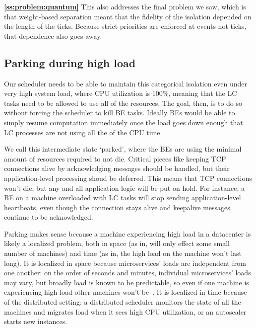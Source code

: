 \textbf{\autoref{ss:problem:quantum}} This also addresses the final problem we
saw, which is that weight-based separation meant that the fidelity of the
isolation depended on the length of the ticks. Because strict priorities are
enforced at events not ticks, that dependence also goes away.

\subsection{Parking during high load}\label{ss:approach:parking}

Our scheduler needs to be able to maintain this categorical isolation even under
very high system load, where CPU utilization is 100\%, meaning that the LC tasks
need to be allowed to use all of the resources. The goal, then, is to do so
without forcing the scheduler to kill BE tasks. Ideally BEs would be able to
simply resume computation immediately once the load goes down enough that LC
processes are not using all the of the CPU time.

We call this intermediate state `parked', where the BEs are using the minimal
amount of resources required to not die. Critical pieces like keeping TCP
connections alive by acknowledging messages should be handled, but their
application-level processing shoud be deferred. This means that TCP connections
won't die, but any and all application logic will be put on hold. For instance, a
BE on a machine overloaded with LC tasks will stop sending application-level
heartbeats, even though the connection stays alive and keepalive messages
continue to be acknowledged.

Parking makes sense because a machine experiencing high load in a datacenter is
likely a localized problem, both in space (as in, will only effect some small
number of machines) and time (as in, the high load on the machine won't last
long). It is localized in space because microservices' loads are independent
from one another: on the order of seconds and minutes, individual microservices'
loads may vary, but broadly load is known to be predictable, so even if one
machine is experiencing high load other machines won't be~\cite{TODO}. It is
localized in time because of the distributed setting: a distributed scheduler
monitors the state of all the machines and migrates load when it sees high CPU
utilization, or an autoscaler starts new instances.
